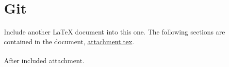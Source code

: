 \documentclass[10pt,a4paper]{article}
\begin{document}
\sectionbreak{}

\section*{Git}

\paragraph{}
Include another LaTeX document into this one. The following sections are
contained in the document, \href{run:./attachment.tex}{attachment.tex}.



\paragraph{}
After included attachment.
\end{document}
